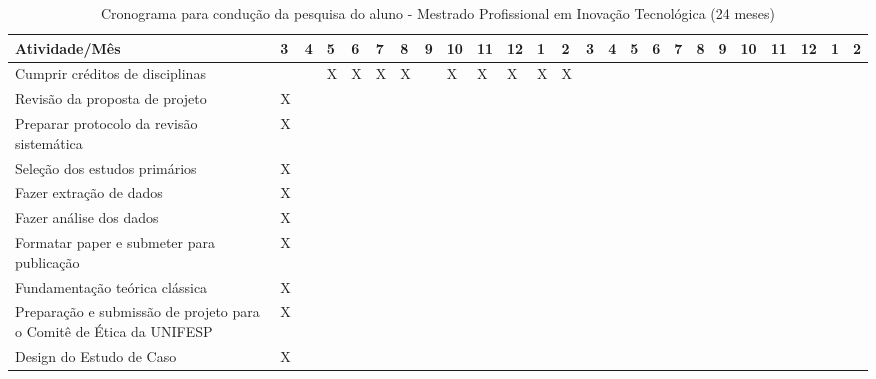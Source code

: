 \begin{table}[h]
\centering
\caption{Cronograma para condução da pesquisa do aluno - Mestrado Profissional em Inovação Tecnológica (24 meses)}
\label{crono}
\begin{tabular}{l | l | l | l | l | l | l | l | l | l | l | l | l | l | l | l | l | l | l | l | l | l | l | l | l }
\hline
\textbf{Atividade/Mês} & \textbf{3} & \textbf{4} & \textbf{5} & \textbf{6}  & \textbf{7} & \textbf{8} & \textbf{9} & \textbf{10} & \textbf{11} & \textbf{12} & \textbf{1} & \textbf{2} & \textbf{3} & \textbf{4} & \textbf{5} & \textbf{6} & \textbf{7} & \textbf{8} & \textbf{9} & \textbf{10} & \textbf{11} & \textbf{12} & \textbf{1} & \textbf{2}\\ \hline \hline
Cumprir créditos de disciplinas  &   &   &X   &X   &X   &X   &   &X   &X   &X   &X   &X   &   &   &   &   &  &   &   &  &   \\ \hline
Revisão da proposta de projeto & X  &   &   &   &   &   &   &   &   &   &   &   &   &   &   &   &  &   &   &  &   \\ \hline
Preparar protocolo da revisão sistemática& X  &   &   &   &   &   &   &   &   &   &   &   &   &   &   &   &  &   &   &  &   \\ \hline

Seleção dos estudos primários & X  &   &   &   &   &   &   &   &   &   &   &   &   &   &   &   &  &   &   &  &   \\ \hline

Fazer extração de dados & X  &   &   &   &   &   &   &   &   &   &   &   &   &   &   &   &  &   &   &  &   \\ \hline

Fazer análise dos dados& X  &   &   &   &   &   &   &   &   &   &   &   &   &   &   &   &  &   &   &  &   \\ \hline

Formatar paper e submeter para publicação & X  &   &   &   &   &   &   &   &   &   &   &   &   &   &   &   &  &   &   &  &   \\ \hline

Fundamentação teórica clássica& X  &   &   &   &   &   &   &   &   &   &   &   &   &   &   &   &  &   &   &  &   \\ \hline

Preparação e submissão de projeto para o Comitê de Ética da UNIFESP & X  &   &   &   &   &   &   &   &   &   &   &   &   &   &   &   &  &   &   &  &   \\ \hline

Design do Estudo de Caso & X  &   &   &   &   &   &   &   &   &   &   &   &   &   &   &   &  &   &   &  &   \\ \hline


\end{tabular}
\end{table}
